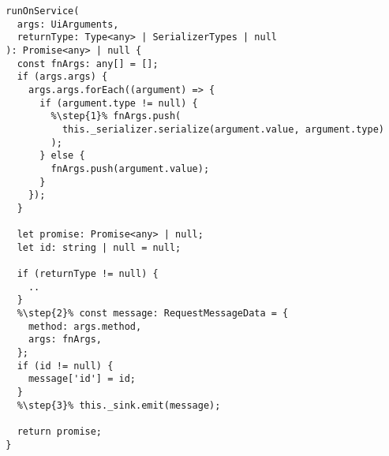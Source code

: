 \begin{verbatim}
  runOnService(
    args: UiArguments,
    returnType: Type<any> | SerializerTypes | null
  ): Promise<any> | null {
    const fnArgs: any[] = [];
    if (args.args) {
      args.args.forEach((argument) => {
        if (argument.type != null) {
          %\step{1}% fnArgs.push(
            this._serializer.serialize(argument.value, argument.type)
          );
        } else {
          fnArgs.push(argument.value);
        }
      });
    }

    let promise: Promise<any> | null;
    let id: string | null = null;

    if (returnType != null) {
      ..
    }
    %\step{2}% const message: RequestMessageData = {
      method: args.method,
      args: fnArgs,
    };
    if (id != null) {
      message['id'] = id;
    }
    %\step{3}% this._sink.emit(message);

    return promise;
  }
\end{verbatim}
